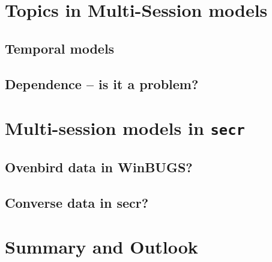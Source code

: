 \begin{figure}[htp]
\begin{center}
\end{center}
\label{fig.fig1}
\end{figure}


\section{Topics in Multi-Session models}

\subsection{Temporal models }


\subsection{Dependence -- is it a problem?}


\section{Multi-session models in \mbox{\tt secr}  }


\subsection{Ovenbird data in WinBUGS?}


\subsection{Converse data in secr?}



\section{Summary and Outlook}










